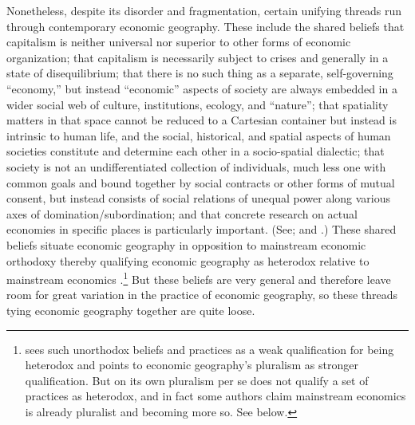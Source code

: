 Nonetheless, despite its disorder and fragmentation, certain unifying
threads run through contemporary economic geography. These include
the shared beliefs that capitalism is neither universal nor superior
to other forms of economic organization; that capitalism is necessarily
subject to crises and generally in a state of disequilibrium; that
there is no such thing as a separate, self-governing ``economy,''
but instead ``economic'' aspects of society are always embedded
in a wider social web of culture, institutions, ecology, and ``nature'';
that spatiality matters in that space cannot be reduced to a Cartesian
container but instead is intrinsic to human life, and the social,
historical, and spatial aspects of human societies constitute and
determine each other in a socio-spatial dialectic; that society is
not an undifferentiated collection of individuals, much less one with
common goals and bound together by social contracts or other forms
of mutual consent, but instead consists of social relations of unequal
power along various axes of domination/subordination; and that concrete
research on actual economies in specific places is particularly important.
(See\citealt{sheppard2011geographical,sheppard2012thelong,peck2016macroeconomic};
and \citealt{soja1980thesociospatial}.) These shared beliefs situate
economic geography in opposition to mainstream economic orthodoxy
thereby qualifying economic geography as heterodox relative to mainstream
economics \citep{Peck_2015_Navigating,sheppard00000heterodox}.\footnote{\citeauthor{Peck_2015_Navigating}sees such unorthodox beliefs and
practices as a weak qualification for being heterodox and points to
economic geography's pluralism as stronger qualification. But on its
own pluralism per se does not qualify a set of practices as heterodox,
and in fact some authors claim mainstream economics is already pluralist
and becoming more so. See below.} But these beliefs are very general and therefore leave room for great
variation in the practice of economic geography, so these threads
tying economic geography together are quite loose.

